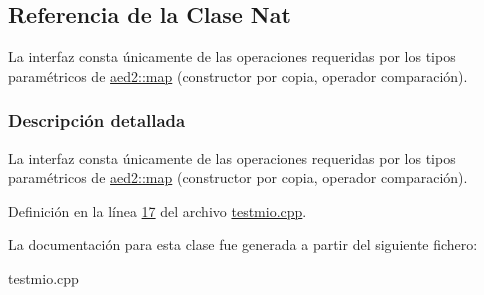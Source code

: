 \hypertarget{classNat}{}\subsection{Referencia de la Clase Nat}
\label{classNat}


La interfaz consta únicamente de las operaciones requeridas por los tipos paramétricos de \hyperlink{classaed2_1_1map}{aed2\+::map} (constructor por copia, operador comparación).  




\subsubsection{Descripción detallada}
La interfaz consta únicamente de las operaciones requeridas por los tipos paramétricos de \hyperlink{classaed2_1_1map}{aed2\+::map} (constructor por copia, operador comparación). 

Definición en la línea \hyperlink{testmio_8cpp_source_l00017}{17} del archivo \hyperlink{testmio_8cpp_source}{testmio.\+cpp}.



La documentación para esta clase fue generada a partir del siguiente fichero\+:\begin{DoxyCompactItemize}
\item 
testmio.\+cpp\end{DoxyCompactItemize}
